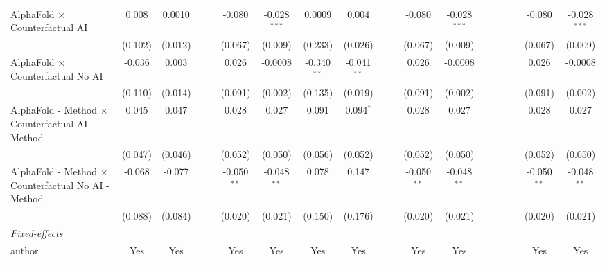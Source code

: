 \begin{tabular}{lcccccccccccccccccc}
   AlphaFold $\times$ Counterfactual AI                       & 0.008   & 0.0010      &     &     & -0.080        & -0.028$^{***}$ & 0.0009        & 0.004         &     &      & -0.080        & -0.028$^{***}$ &      &      &      &      & -0.080        & -0.028$^{***}$\\   
                                                              & (0.102) & (0.012)     &     &     & (0.067)       & (0.009)        & (0.233)       & (0.026)       &     &      & (0.067)       & (0.009)        &      &      &      &      & (0.067)       & (0.009)\\   
   AlphaFold $\times$ Counterfactual No AI                    & -0.036  & 0.003       &     &     & 0.026         & -0.0008        & -0.340$^{**}$ & -0.041$^{**}$ &     &      & 0.026         & -0.0008        &      &      &      &      & 0.026         & -0.0008\\   
                                                              & (0.110) & (0.014)     &     &     & (0.091)       & (0.002)        & (0.135)       & (0.019)       &     &      & (0.091)       & (0.002)        &      &      &      &      & (0.091)       & (0.002)\\   
   AlphaFold - Method $\times$ Counterfactual AI - Method     & 0.045   & 0.047       &     &     & 0.028         & 0.027          & 0.091         & 0.094$^{*}$   &     &      & 0.028         & 0.027          &      &      &      &      & 0.028         & 0.027\\   
                                                              & (0.047) & (0.046)     &     &     & (0.052)       & (0.050)        & (0.056)       & (0.052)       &     &      & (0.052)       & (0.050)        &      &      &      &      & (0.052)       & (0.050)\\   
   AlphaFold - Method $\times$ Counterfactual No AI - Method  & -0.068  & -0.077      &     &     & -0.050$^{**}$ & -0.048$^{**}$  & 0.078         & 0.147         &     &      & -0.050$^{**}$ & -0.048$^{**}$  &      &      &      &      & -0.050$^{**}$ & -0.048$^{**}$\\   
                                                              & (0.088) & (0.084)     &     &     & (0.020)       & (0.021)        & (0.150)       & (0.176)       &     &      & (0.020)       & (0.021)        &      &      &      &      & (0.020)       & (0.021)\\   
   \midrule
   \emph{Fixed-effects}\\
   author                                                     & Yes     & Yes         &     &     & Yes           & Yes            & Yes           & Yes           &     &      & Yes           & Yes            &      &      &      &      & Yes           & Yes\\  

\end{tabular}
